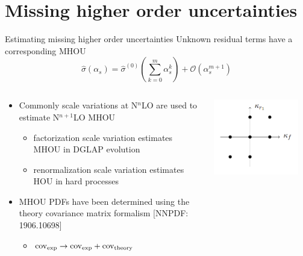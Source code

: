\documentclass[aspectratio=169, 8pt,t]{beamer}
\begin{document}

\section{Missing higher order uncertainties}

\begin{frame}{Estimating missing higher order uncertainties}
  Unknown residual terms have a corresponding MHOU
  \begin{equation*}
    \hat{\sigma}\left(\alpha_s\right)=\hat{\sigma}^{(0)}\left(\sum_{k=0}^m \alpha_s^k\right)+\mathcal{O}\left(\alpha_s^{m+1}\right)
    \end{equation*}
  \begin{columns}[T]
    \begin{column}{0.49\textwidth}
      \begin{itemize}
        \item Commonly scale variations at N$^n$LO are used to estimate N$^{n+1}$LO MHOU
        \begin{itemize}
          \item factorization scale variation estimates MHOU in DGLAP evolution
          \item renormalization scale variation estimates HOU in hard processes
        \end{itemize}
        \item MHOU PDFs have been determined using the theory covariance matrix formalism {\color{gray}\small [NNPDF: 1906.10698]}
        \begin{itemize}
          \item $\operatorfont{cov_{exp}} \rightarrow \operatorfont{cov_{exp}}+\operatorfont{cov_{theory}}$
        \end{itemize}
      \end{itemize}
    \end{column}
    \begin{column}{0.49\textwidth}
      \vspace*{-2em}
      \includegraphics[width=0.89\textwidth]{figures/7ptsv.png}

\end{column}
\end{columns}
\end{frame}
\end{document}
